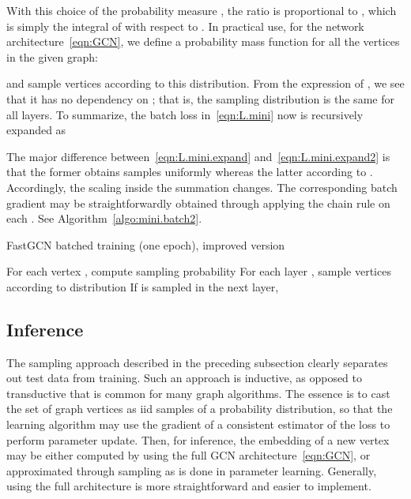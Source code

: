 \documentclass{article} \usepackage{iclr2018_conference,times}
\theoremstyle{plain}\newtheorem{theorem}{Theorem}\theoremstyle{plain}\newtheorem{proposition}[theorem]{Proposition}
\theoremstyle{plain}\newtheorem{corollary}[theorem]{Corollary}
\theoremstyle{plain}\newtheorem{lemma}[theorem]{Lemma}
\begin{document}
With this choice of the probability measure , the ratio  is proportional to , which is simply the integral of  with respect to . In practical use, for the network architecture~\eqref{eqn:GCN}, we define a probability mass function for all the vertices in the given graph:

and sample  vertices  according to this distribution. From the expression of , we see that it has no dependency on ; that is, the sampling distribution is the same for all layers. To summarize, the batch loss  in~\eqref{eqn:L.mini} now is recursively expanded as

The major difference between~\eqref{eqn:L.mini.expand} and~\eqref{eqn:L.mini.expand2} is that the former obtains samples uniformly whereas the latter according to . Accordingly, the scaling inside the summation changes. The corresponding batch gradient may be straightforwardly obtained through applying the chain rule on each . See Algorithm~\ref{algo:mini.batch2}.

\begin{algorithm}[ht]
  \caption{FastGCN batched training (one epoch), improved version}
  \label{algo:mini.batch2}
  \begin{algorithmic}[1]
    \State For each vertex , compute sampling probability 
    \State For each layer , sample  vertices  according to distribution 
     
    \State If  is sampled in the next layer, 
    \EndFor
    \State 
    \EndFor
  \end{algorithmic}
\end{algorithm}


\subsection{Inference}\label{sec:inference}
The sampling approach described in the preceding subsection clearly separates out test data from training. Such an approach is inductive, as opposed to transductive that is common for many graph algorithms. The essence is to cast the set of graph vertices as iid samples of a probability distribution, so that the learning algorithm may use the gradient of a consistent estimator of the loss to perform parameter update. 
Then, for inference, the embedding of a new vertex may be either computed by using the full GCN architecture~\eqref{eqn:GCN}, or approximated through sampling as is done in parameter learning. Generally, using the full architecture is more straightforward and easier to implement.
\end{document}
